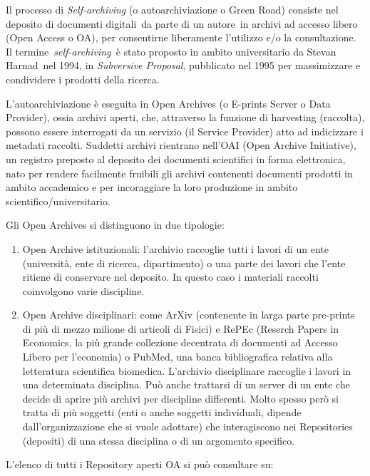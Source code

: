 \documentclass[
  b5paper,
  twoside,
  11pt,
  chapterprefix=false,
  bibliography=totocnumbered,
  parskip=0]{scrbook}
\begin{document}
Il processo di \emph{Self-archiving} (o autoarchiviazione o Green Road)
consiste nel deposito di documenti digitali~da parte di un autore~in
archivi ad accesso libero (Open Access o OA), per consentirne
liberamente l'utilizzo e/o la consultazione. Il
termine~\emph{self-archiving}~è stato proposto in ambito universitario da
Stevan Harnad~nel 1994, in \emph{Subversive Proposal}, pubblicato nel 1995
per massimizzare e condividere i prodotti della ricerca.

L'autoarchiviazione è eseguita in Open Archives (o E-prints Server o
Data Provider), ossia archivi aperti, che, attraverso la funzione di
harvesting (raccolta), possono essere interrogati da un servizio (il
Service Provider) atto ad indicizzare i metadati raccolti. Suddetti
archivi rientrano nell'OAI (Open Archive Initiative), un registro
preposto al deposito dei documenti scientifici in forma elettronica,
nato per rendere facilmente fruibili gli archivi contenenti documenti
prodotti in ambito accademico e per incoraggiare la loro produzione in
ambito scientifico/universitario.

Gli Open Archives si distinguono in due tipologie:

\begin{enumerate}
\def\labelenumi{\arabic{enumi}.}
\item
  Open Archive istituzionali: l'archivio raccoglie tutti i lavori di
  un ente (università, ente di ricerca, dipartimento) o una parte dei
  lavori che l'ente ritiene di conservare nel deposito. In questo caso
  i materiali raccolti coinvolgono varie discipline.
\item
  Open Archive disciplinari: come ArXiv (contenente in larga parte
  pre-prints di più di mezzo milione di articoli di Fisici) e RePEc
  (Reserch Papers in Economics, la più grande collezione decentrata di
  documenti ad Accesso Libero per l'economia) o PubMed, una banca
  bibliografica relativa alla letteratura scientifica biomedica.
  L'archivio disciplinare raccoglie i lavori in una determinata
  disciplina. Può anche trattarsi di un server di un ente che decide
  di aprire più archivi per discipline differenti. Molto spesso però
  si tratta di più soggetti (enti o anche soggetti individuali,
  dipende dall'organizzazione che si vuole adottare) che interagiscono
  nei Repositories (depositi) di una stessa disciplina o di un
  argomento specifico.
\end{enumerate}

L'elenco di tutti i Repository aperti OA si può consultare su:
\end{document}
